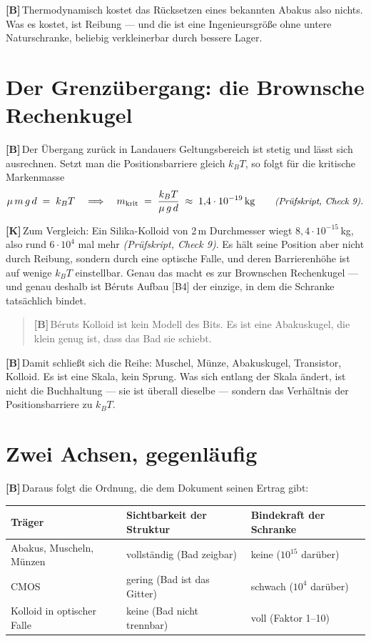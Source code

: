 \documentclass[11pt,a4paper]{article}
\newcommand{\LK}{\textcolor{layK}{\textbf{\footnotesize\textsf{[K]}}}\,}
\newcommand{\LB}{\textcolor{layB}{\textbf{\footnotesize\textsf{[B]}}}\,}
\newcommand{\pruef}[1]{{\small\itshape(Prüfskript, #1)}}
\begin{document}
\LB Thermodynamisch kostet das Rücksetzen eines bekannten Abakus also nichts. Was
es kostet, ist Reibung --- und die ist eine Ingenieursgröße ohne untere
Naturschranke, beliebig verkleinerbar durch bessere Lager.

\section{Der Grenzübergang: die Brownsche Rechenkugel}

\LB Der Übergang zurück in Landauers Geltungsbereich ist stetig und lässt sich
ausrechnen. Setzt man die Positionsbarriere gleich $k_BT$, so folgt für die
kritische Markenmasse
\begin{equation}
  \mu\,m\,g\,d \;=\; k_B T
  \quad\Longrightarrow\quad
  m_{\text{krit}} \;=\; \frac{k_B T}{\mu\,g\,d} \;\approx\; 1{,}4\cdot10^{-19}\,\text{kg}
  \qquad \text{\pruef{Check 9}} .
\end{equation}

\LK Zum Vergleich: Ein Silika-Kolloid von 2\,\textmu m Durchmesser wiegt
$8{,}4\cdot10^{-15}$\,kg, also rund $6\cdot10^{4}$ mal mehr \pruef{Check 9}. Es
hält seine Position aber nicht durch Reibung, sondern durch eine optische Falle,
und deren Barrierenhöhe ist auf wenige $k_BT$ einstellbar. Genau das macht es zur
Brownschen Rechenkugel --- und genau deshalb ist Béruts Aufbau [B4] der einzige,
in dem die Schranke tatsächlich bindet.

\begin{quote}
\LB Béruts Kolloid ist kein Modell des Bits. Es ist eine Abakuskugel, die klein
genug ist, dass das Bad sie schiebt.
\end{quote}

\LB Damit schließt sich die Reihe: Muschel, Münze, Abakuskugel, Transistor,
Kolloid. Es ist eine Skala, kein Sprung. Was sich entlang der Skala ändert, ist
nicht die Buchhaltung --- sie ist überall dieselbe --- sondern das Verhältnis der
Positionsbarriere zu $k_BT$.

\section{Zwei Achsen, gegenläufig}

\LB Daraus folgt die Ordnung, die dem Dokument seinen Ertrag gibt:

\begin{center}
\small
\begin{tabular}{@{}lll@{}}
\toprule
\textbf{Träger} & \textbf{Sichtbarkeit der Struktur} & \textbf{Bindekraft der Schranke} \\
\midrule
Abakus, Muscheln, Münzen & vollständig (Bad zeigbar) & keine ($10^{15}$ darüber) \\
CMOS & gering (Bad ist das Gitter) & schwach ($10^{4}$ darüber) \\
Kolloid in optischer Falle & keine (Bad nicht trennbar) & voll (Faktor 1--10) \\
\bottomrule
\end{tabular}
\end{center}
\end{document}
